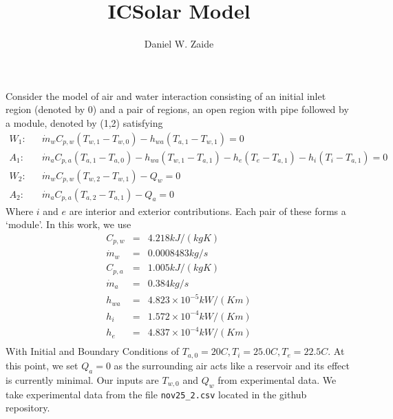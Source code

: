 \documentclass[11pt]{article}
\title{ICSolar Model}
\author{Daniel W. Zaide}
\begin{document}
\maketitle
Consider the model of air and water interaction consisting of an initial inlet region (denoted by 0) and a pair of regions, an open region with pipe followed by a module, denoted by (1,2) satisfying 
\begin{eqnarray} 
W_1: & & \dot{m}_wC_{p,w}(T_{w,1}-T_{w,0}) - h_{wa}(T_{a,1}-T_{w,1}) = 0 \\
A_1: & & \dot{m}_aC_{p,a}(T_{a,1}-T_{a,0}) - h_{wa}(T_{w,1}-T_{a,1}) - h_{e}(T_e-T_{a,1}) - h_{i}(T_i-T_{a,1})= 0 \\
W_2: & & \dot{m}_wC_{p,w}(T_{w,2}-T_{w,1}) - Q_w = 0\\
A_2: & & \dot{m}_aC_{p,a}(T_{a,2}-T_{a,1}) - Q_a = 0 
\end{eqnarray}
Where $i$ and $e$ are interior and exterior contributions. Each pair of these forms a `module'. In this work, we use
\begin{eqnarray}
C_{p,w} & = & 4.218 kJ/(kg K) \\
\dot{m}_w & = & 0.0008483 kg/s \\
C_{p,a} & = & 1.005 kJ/(kg K) \\
\dot{m}_a & = & 0.384 kg/s \\
h_{wa} & = & 4.823 \times 10^{-5} kW/(K m)\\
h_{i} & = & 1.572 \times 10^{-4} kW/(K m)\\
h_{e} & = & 4.837 \times 10^{-4} kW/(K m)\\
\end{eqnarray}
With Initial and Boundary Conditions of $T_{a,0} = 20 C, T_i = 25.0 C, T_e = 22.5 C$. At this point, we set $Q_a = 0$ as the surrounding air acts like a reservoir and its effect is currently minimal. Our inputs are $T_{w,0}$ and $Q_w$ from experimental data. We take experimental data from the file \texttt{nov25\_2.csv} located in the github repository. 
\end{document}
